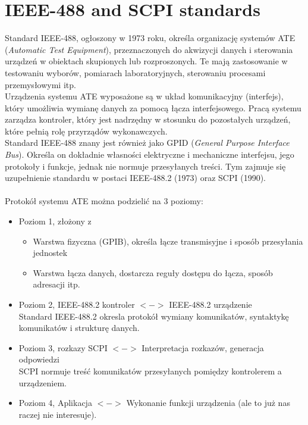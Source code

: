 
\newcommand\XOR{\mathbin{\char`\^}}
\newpage
\section{IEEE-488 and SCPI standards}
Standard IEEE-488, ogłoszony w 1973 roku, określa organizację systemów ATE (\emph{Automatic Test Equipment}), przeznaczonych do akwizycji danych i sterowania urządzeń w obiektach skupionych lub rozproszonych. Te mają zastosowanie w testowaniu wyborów, pomiarach laboratoryjnych, sterowaniu procesami przemysłowymi itp.\\
Urządzenia systemu ATE wyposażone są w układ komunikacyjny (interfejs), który umożliwia wymianę danych za pomocą łącza interfejsowego. Pracą systemu zarządza kontroler, który jest nadrzędny w stosunku do pozostałych urządzeń, które pełnią rolę przyrządów wykonawczych.\\
Standard IEEE-488 znany jest również jako GPID (\emph{General Purpose Interface Bus}). Określa on dokładnie własności elektryczne i mechaniczne interfejsu, jego protokoły i funkcje, jednak nie normuje przesyłanych treści. Tym zajmuje się uzupełnienie standardu w postaci IEEE-488.2 (1973) oraz SCPI (1990).\\\\
Protokół systemu ATE można podzielić na 3 poziomy:
\begin{itemize}
	\item Poziom 1, złożony z
	\begin{itemize}
		\item Warstwa fizyczna (GPIB), określa łącze transmisyjne i sposób przesyłania jednostek
		\item Warstwa łącza danych, dostarcza reguły dostępu do łącza, sposób adresacji itp.
	\end{itemize}
	\item Poziom 2, IEEE-488.2 kontroler $<->$ IEEE-488.2 urządzenie\\
	Standard IEEE-488.2 okresla protokół wymiany komunikatów, syntaktykę komunikatów i strukturę danych.
	\item Poziom 3, rozkazy SCPI $<->$ Interpretacja rozkazów, generacja odpowiedzi\\
	SCPI normuje treść komunikatów przesyłanych pomiędzy kontrolerem a urządzeniem.
	\item Poziom 4, Aplikacja $<->$ Wykonanie funkcji urządzenia (ale to już nas raczej nie interesuje).
\end{itemize}
